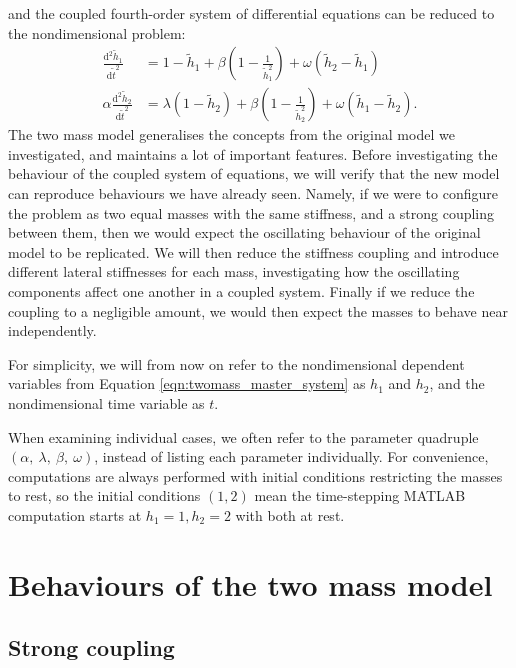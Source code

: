and the coupled fourth-order system of differential equations can be reduced to the nondimensional problem:
\begin{equation}
    \begin{aligned}
        \frac{\mathrm{d}^2 \tilde{h}_1}{\mathrm{d}\tilde{t}^2} &= 1 - \tilde{h}_1 + \beta \left( 1 - \frac{1}{\tilde{h}_1^2} \right) + \omega(\tilde{h}_2-\tilde{h}_1) \\
        \alpha\frac{\mathrm{d}^2 \tilde{h}_2}{\mathrm{d}\tilde{t}^2} &= \lambda(1 - \tilde{h}_2) + \beta \left( 1 - \frac{1}{\tilde{h}_2^2} \right) + \omega(\tilde{h}_1-\tilde{h}_2).
    \end{aligned}
    \label{eqn:twomass_master_system}
\end{equation}
The two mass model generalises the concepts from the original model we investigated,
and maintains a lot of important features.
Before investigating the behaviour of the coupled system of equations,
we will verify that the new model can reproduce behaviours we have already seen.
Namely, if we were to configure the problem as two equal masses with the same stiffness,
and a strong coupling between them,
then we would expect the oscillating behaviour of the original model to be replicated.
We will then reduce the stiffness coupling and introduce different lateral stiffnesses for each mass,
investigating how the oscillating components affect one another in a coupled system.
Finally if we reduce the coupling to a negligible amount,
we would then expect the masses to behave near independently.

For simplicity, we will from now on refer to the nondimensional dependent variables from Equation \ref{eqn:twomass_master_system} as \(h_1\) and \(h_2\),
and the nondimensional time variable as $t$.

When examining individual cases, we often refer to the parameter quadruple \((\alpha,~\lambda,~\beta,~\omega)\), instead of listing each parameter individually.
For convenience, computations are always performed with initial conditions restricting the masses to rest,
so the initial conditions \((1,2)\) mean the time-stepping MATLAB computation starts at $h_1=1,h_2=2$ with both at rest.

\section{Behaviours of the two mass model}

\subsection{Strong coupling}


